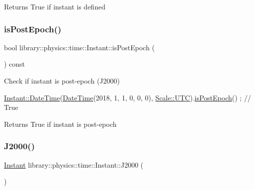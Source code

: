 \begin{DoxyReturn}{Returns}
True if instant is defined 
\end{DoxyReturn}
\mbox{\label{classlibrary_1_1physics_1_1time_1_1_instant_a649a2505c26b68b17ed7a80429b599ee}} 
\subsubsection{\texorpdfstring{is\+Post\+Epoch()}{isPostEpoch()}}
{\footnotesize\ttfamily bool library\+::physics\+::time\+::\+Instant\+::is\+Post\+Epoch (\begin{DoxyParamCaption}{ }\end{DoxyParamCaption}) const}



Check if instant is post-\/epoch (J2000) 


\begin{DoxyCode}
\hyperlink{classlibrary_1_1physics_1_1time_1_1_instant_ac827b6ffa57ce75a3c56c462d4c872f8}{Instant::DateTime}(\hyperlink{classlibrary_1_1physics_1_1time_1_1_instant_ac827b6ffa57ce75a3c56c462d4c872f8}{DateTime}(2018, 1, 1, 0, 0, 0), 
      \hyperlink{namespacelibrary_1_1physics_1_1time_a09d2bc9fbc7b0b5f92e1419bd655e6bba9234324ddf6b4176b57d803a925b7961}{Scale::UTC}).\hyperlink{classlibrary_1_1physics_1_1time_1_1_instant_a649a2505c26b68b17ed7a80429b599ee}{isPostEpoch}() ; \textcolor{comment}{// True}
\end{DoxyCode}


\begin{DoxyReturn}{Returns}
True if instant is post-\/epoch 
\end{DoxyReturn}
\mbox{\label{classlibrary_1_1physics_1_1time_1_1_instant_a2a4f57aa71693b8def06788d55bc3bd3}} 
\subsubsection{\texorpdfstring{J2000()}{J2000()}}
{\footnotesize\ttfamily \hyperlink{classlibrary_1_1physics_1_1time_1_1_instant}{Instant} library\+::physics\+::time\+::\+Instant\+::\+J2000 (\begin{DoxyParamCaption}{ }\end{DoxyParamCaption})\hspace{0.3cm}{\ttfamily [static]}}



